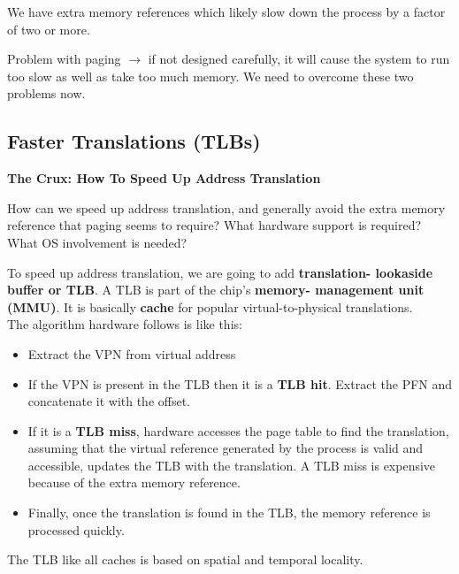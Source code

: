 We have extra memory references which likely slow down the process by a factor
of two or more.

Problem with paging $\rightarrow$ if not designed carefully, it will cause the
system to run too slow as well as take too much memory. We need to overcome 
these two problems now.

\subsection{Faster Translations (TLBs)}

\begin{tcolorbox}
    \begin{center}
        \textbf{The Crux: How To Speed Up Address Translation}
    \end{center}

    How can we speed up address translation, and generally avoid the extra
    memory reference that paging seems to require? What hardware support is
    required? What OS involvement is needed? 
\end{tcolorbox}

To speed up address translation, we are going to add \textbf{translation-
lookaside buffer or TLB}. A TLB is part of the chip's \textbf{memory-
management unit (MMU)}. It is basically \textbf{cache} for popular
virtual-to-physical translations.\\

The algorithm hardware follows is like this:

\begin{itemize}
    \item Extract the VPN from virtual address
    \item If the VPN is present in the TLB then it is a \textbf{TLB hit}.
        Extract the PFN and concatenate it with the offset.
    \item If it is a \textbf{TLB miss}, hardware accesses the page table
        to find the translation, assuming that the virtual reference generated
        by the process is valid and accessible, updates the TLB with the
        translation. A TLB miss is expensive because of the extra memory
        reference.
    \item Finally, once the translation is found in the TLB, the memory 
        reference is processed quickly.
\end{itemize}

The TLB like all caches is based on spatial and temporal locality.

